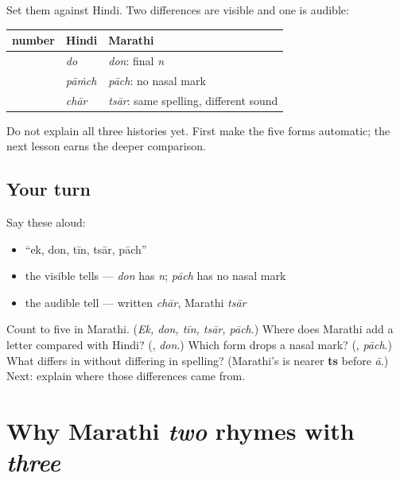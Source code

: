 \begin{grammarlens}[title={What you've built: three Marathi tells}]
Set them against Hindi. Two differences are visible and one is audible:

\noindent
\begin{tabularx}{\linewidth}{@{}>{\raggedright\arraybackslash}X>{\raggedright\arraybackslash}X>{\raggedright\arraybackslash}X@{}}
\toprule
\textbf{number} & \textbf{Hindi} & \textbf{Marathi} \\
\midrule
2 & \mr{दो} \emph{do} & \textbf{\mr{दोन}} \emph{don}: final \emph{n} \\
5 & \mr{पाँच} \emph{pāṁch} & \textbf{\mr{पाच}} \emph{pāch}: no nasal mark \\
4 & \mr{चार} \emph{chār} & \textbf{\mr{चार}} \emph{tsār}: same spelling, different sound \\
\bottomrule
\end{tabularx}

Do not explain all three histories yet. First make the five forms automatic; the next lesson earns the deeper comparison.
\end{grammarlens}

\subsection*{Your turn}
Say these aloud:

\begin{itemize}
\raggedright
  \item \textquotedblleft{}ek, don, tīn, tsār, pāch\textquotedblright{}
  \item the visible tells — \emph{don} has \emph{n}; \emph{pāch} has no nasal mark
  \item the audible tell — written \emph{chār}, Marathi \emph{tsār}
\end{itemize}

\begin{tcolorbox}[breakable,colback=teal!4,colframe=teal!35!black,title={Before you move on}]
Count to five in Marathi. (\emph{Ek, don, tīn, tsār, pāch}.) Where does Marathi add a letter compared with Hindi? (\textbf{}, \emph{don}.) Which form drops a nasal mark? (\textbf{}, \emph{pāch}.) What differs in \textbf{} without differing in spelling? (Marathi's \textbf{} is nearer \textbf{ts} before \emph{ā}.) Next: explain where those differences came from.
\end{tcolorbox}
\section[\texorpdfstring{\mr{दोन} · \mr{तीन} · \mr{पाच} … (don · tīn · pāch …)}{दोन · तीन · पाच … (don · tīn · pāch …)}]{Why Marathi \emph{two} rhymes with \emph{three}}


